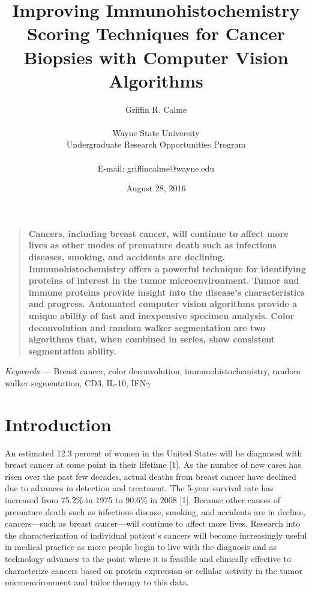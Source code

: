 \documentclass[12pt]{article}
\title{Improving Immunohistochemistry Scoring Techniques for Cancer Biopsies with Computer Vision Algorithms}
\author
{Griffin R. Calme\\
\\
\normalsize{Wayne State University}\\
\normalsize{Undergraduate Research Opportunities Program}\\
\\
\normalsize{E-mail:  griffincalme@wayne.edu}
}
\date{August 28, 2016}
\newenvironment{sciabstract}{%
\begin{quote} \bf}
{\end{quote}}
\begin{document}
 


\baselineskip24pt


\maketitle 




\begin{sciabstract}
  Cancers, including breast cancer, will continue to affect more lives as other modes of premature death such as infectious diseases, smoking, and accidents are declining. Immunohistochemistry offers a powerful technique for identifying proteins of interest in the tumor microenvironment. Tumor and immune proteins provide insight into the disease's characteristics and progress. Automated computer vision algorithms provide a unique ability of fast and inexpensive specimen analysis. Color deconvolution and random walker segmentation are two algorithms that, when combined in series, show consistent segmentation ability.




\end{sciabstract}

\smallskip

\indent \textit{Keywords} --- Breast cancer, color deconvolution, immunohistochemistry, random walker \indent segmentation, CD3, IL-10, IFN$\gamma$



\break
\section*{Introduction}

An estimated 12.3 percent of women in the United States will be diagnosed with breast cancer at some point in their lifetime [1]. As the number of new cases has risen over the past few decades, actual deaths from breast cancer have declined due to advances in detection and treatment. The 5-year survival rate has increased from 75.2\% in 1975 to 90.6\% in 2008 [1]. Because other causes of premature death such as infectious disease, smoking, and accidents are in decline, cancers---such as breast cancer---will continue to affect more lives. Research into the characterization of individual patient's cancers will become increasingly useful in medical practice as more people begin to live with the diagnosis and as technology advances to the point where it is feasible and clinically effective to characterize cancers based on protein expression or cellular activity in the tumor microenvironment and tailor therapy to this data.
\end{document}
